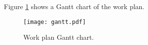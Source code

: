 Figure \ref{fig:gantt} shows a Gantt chart of the work plan.

\vspace{0.4cm}

\begin{figure}[H]
\centerline{\texttt{[image: gantt.pdf]}}
\caption{Work plan Gantt chart.}
\label{fig:gantt}
\end{figure}

